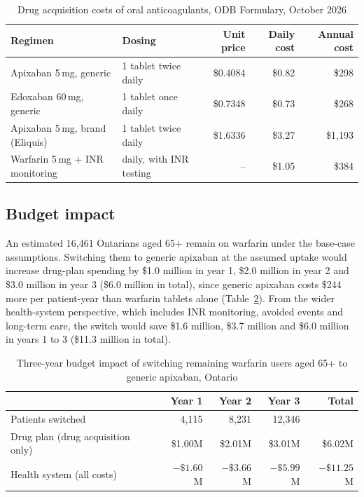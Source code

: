 \documentclass[11pt,letterpaper]{article}
\begin{document}
\begin{table}[H]
\centering
\caption{Drug acquisition costs of oral anticoagulants, ODB Formulary, October 2026}
\label{tab:cma}
\small
\begin{tabular}{@{}llrrr@{}}
\toprule
Regimen & Dosing & Unit price & Daily cost & Annual cost \\
\midrule
Apixaban 5\,mg, generic & 1 tablet twice daily & \$0.4084 & \$0.82 & \$298 \\
Edoxaban 60\,mg, generic & 1 tablet once daily & \$0.7348 & \$0.73 & \$268 \\
Apixaban 5\,mg, brand (Eliquis) & 1 tablet twice daily & \$1.6336 & \$3.27 & \$1,193 \\
Warfarin 5\,mg + INR monitoring & daily, with INR testing & -- & \$1.05 & \$384 \\
\bottomrule
\end{tabular}
\end{table}

\subsection{Budget impact}

An estimated 16,461 Ontarians aged 65+ remain on warfarin under the base-case assumptions. Switching
them to generic apixaban at the assumed uptake would increase drug-plan spending by \$1.0 million
in year 1, \$2.0 million in year 2 and \$3.0 million in year 3 (\$6.0 million in total), since
generic apixaban costs \$244 more per patient-year than warfarin tablets alone
(Table~\ref{tab:bia}). From the wider health-system perspective, which includes INR monitoring,
avoided events and long-term care, the switch would save \$1.6 million, \$3.7 million and \$6.0
million in years 1 to 3 (\$11.3 million in total).

\begin{table}[H]
\centering
\caption{Three-year budget impact of switching remaining warfarin users aged 65+ to generic
apixaban, Ontario}
\label{tab:bia}
\small
\begin{tabular}{@{}lrrrr@{}}
\toprule
 & Year 1 & Year 2 & Year 3 & Total \\
\midrule
Patients switched & 4,115 & 8,231 & 12,346 & \\
Drug plan (drug acquisition only) & \$1.00M & \$2.01M & \$3.01M & \$6.02M \\
Health system (all costs) & $-\$1.60$M & $-\$3.66$M & $-\$5.99$M & $-\$11.25$M \\
\bottomrule
\end{tabular}
\end{table}
\end{document}
